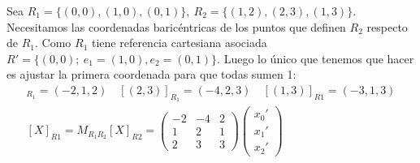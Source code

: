 \documentclass[14pt]{book}
\begin{document}
\begin{ej}
	Sea $R_1 = \{(0, 0), (1, 0), (0, 1)\},\ R_2 = \{(1, 2), (2, 3), (1, 3)\}$. Necesitamos las coordenadas baricéntricas de los puntos que definen $R_2$ respecto de $R_1$. Como $R_1$ tiene referencia cartesiana asociada $R' = \{(0,0);\ e_1 = (1, 0), e_2 = (0, 1)\}$. Luego lo único que tenemos que hacer es ajustar la primera coordenada para que todas sumen 1:
	\begin{align*}
		[(1,2)]_{R_1} = (-2, 1, 2)\quad [(2, 3)]_{R_1} = (-4, 2, 3)\quad [(1, 3)]_{R1} = (-3, 1, 3) \\
		[X]_{R1} = M_{R_1 R_2}[X]_{R2} = \left(
			\begin{array}{ccc}
				-2 & -4 & 2 \\
				1 & 2 & 1 \\
				2 & 3 & 3
			\end{array}
		\right)
		\left(
			\begin{array}{c}
				x_0' \\ x_1' \\ x_2'
			\end{array}
		\right)
	\end{align*}
\end{ej}
\end{document}
